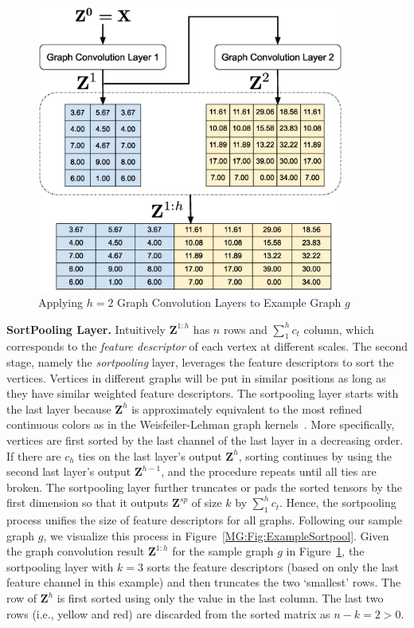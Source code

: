 \begin{figure}[htbp]
    \centerline{\includegraphics[width=0.90\textwidth]{Magic/figures/ExampleGraphConvolution.eps}}
    \caption{Applying $h=2$ Graph Convolution Layers to Example Graph $g$}
    \label{MG:Fig:ExampleGraphConvolution}
\end{figure}

\textbf{SortPooling Layer.} Intuitively $\mathbf{Z}^{1:h}$ has $n$ rows and $\sum_{1}^{h}c_t$ column, which
corresponds to the \textit{feature descriptor} of each vertex at different scales.
The second stage, namely the \textit{sortpooling} layer,
leverages the feature descriptors to sort the vertices.
Vertices in different graphs will be put in similar positions as long as they have similar weighted feature descriptors.
The sortpooling layer starts with the last layer because $\mathbf{Z}^{h}$ is approximately
equivalent to the most refined continuous colors as in the Weisfeiler-Lehman graph kernels~\cite{WlGraphKernel}.
More specifically, vertices are first sorted by the last channel of the last layer in a decreasing order.
If there are $c_h$ ties on the last layer's output $\mathbf{Z}^{h}$,
sorting continues by using the second last layer's output $\mathbf{Z}^{h - 1}$, and the procedure repeats until all ties are broken.
The sortpooling layer further truncates or pads the sorted tensors by the first dimension so that it outputs $\mathbf{Z}^{sp}$ of size $k$ by $\sum_{1}^{h}c_t$.
Hence, the sortpooling process unifies the size of feature descriptors for all graphs.
Following our sample graph $g$, we visualize this process in Figure~\ref{MG:Fig:ExampleSortpool}.
Given the graph convolution result $\mathbf{Z}^{1:h}$ for the sample graph $g$ in Figure~\ref{MG:Fig:ExampleGraphConvolution},
the sortpooling layer with $k = 3$ sorts the feature descriptors (based on only the last feature channel in this example) and then truncates the two `smallest' rows.
The row of $\mathbf{Z}^{h}$ is first sorted using only the value in the last column.
The last two rows (i.e., yellow and red) are discarded from the sorted matrix as $n - k = 2 > 0$.

